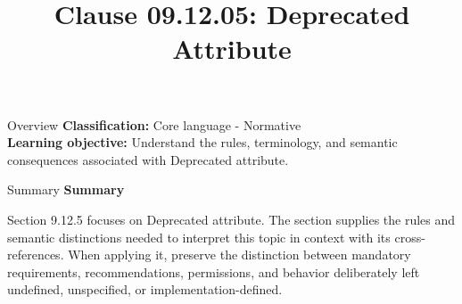 \documentclass[10pt,letterpaper]{article}
\title{Clause 09.12.05: Deprecated Attribute}
\author{}
\date{}
\begin{document}
\maketitle
\begin{CornellOverviewBox}{Overview}
\textbf{Classification:} Core language - Normative\\[2pt]
\textbf{Learning objective:} Understand the rules, terminology, and semantic consequences associated with Deprecated attribute.
\end{CornellOverviewBox}\begin{CornellSummaryBox}{Summary}
{\sffamily\bfseries\color{Accent} Summary}\par\vspace{3pt}Section 9.12.5 focuses on Deprecated attribute. The section supplies the rules and semantic distinctions needed to interpret this topic in context with its cross-references. When applying it, preserve the distinction between mandatory requirements, recommendations, permissions, and behavior deliberately left undefined, unspecified, or implementation-defined.
\end{CornellSummaryBox}
\end{document}
